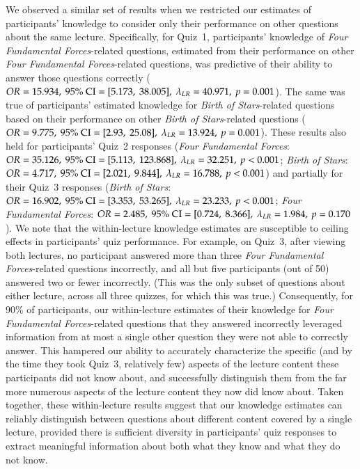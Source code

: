 \documentclass[10pt]{article}
\begin{document}
We observed a similar set of results when we restricted our estimates of
participants' knowledge to consider only
their performance on other questions about the same lecture.
Specifically, for Quiz~1, participants' knowledge of \textit{Four Fundamental
Forces}-related questions, estimated from their performance on other
\textit{Four Fundamental Forces}-related questions, was predictive of their
ability to answer those questions correctly ($OR = 15.934,\ 95\%\
\textnormal{CI} = [5.173,\ 38.005],\ \lambda_{LR} = 40.971,\ p = 0.001$). The
same was true of participants' estimated knowledge for \textit{Birth of
Stars}-related questions based on their performance on other \textit{Birth of
Stars}-related questions ($OR = 9.775,\ 95\%\ \textnormal{CI} = [2.93,\
25.08],\ \lambda_{LR} = 13.924,\ p = 0.001$). These results also held for
participants' Quiz~2 responses (\textit{Four Fundamental Forces}: $OR =
35.126,\ 95\%\ \textnormal{CI} = [5.113,\ 123.868],\ \lambda_{LR} = 32.251,\
p < 0.001$; \textit{Birth of Stars}: $OR = 4.717,\ 95\%\ \textnormal{CI} =
[2.021,\ 9.844],\ \lambda_{LR} = 16.788,\ p < 0.001$) and partially for
their Quiz~3 responses (\textit{Birth of Stars}: $OR = 16.902,\ 95\%\
\textnormal{CI} = [3.353,\ 53.265],\ \lambda_{LR} = 23.233,\ p < 0.001$;
\textit{Four Fundamental Forces}: $OR = 2.485,\ 95\%\ \textnormal{CI} =
[0.724,\ 8.366],\ \lambda_{LR} = 1.984,\ p = 0.170$). We note that 
the within-lecture knowledge estimates are susceptible to ceiling effects in
participants' quiz performance. For example, on Quiz~3, after viewing both lectures, no
participant answered more than three \textit{Four Fundamental Forces}-related
questions incorrectly, and all but five participants (out of 50) answered two or
fewer incorrectly. (This was the only subset of questions about either lecture,
across all three quizzes, for which this was true.) Consequently, for 90\% of
participants, our within-lecture estimates of their knowledge for \textit{Four
Fundamental Forces}-related questions that they answered incorrectly leveraged
information from at most a single other question they were not able to
correctly answer. This hampered our ability to accurately characterize
the specific (and by the time they took Quiz~3, relatively few) aspects of the
lecture content these participants did not know about, and successfully
distinguish them from the far more numerous aspects of the lecture content they
now did know about. Taken together, these within-lecture results suggest that our
knowledge estimates can reliably distinguish between questions about different
content covered by a single lecture, provided there is sufficient diversity in
participants' quiz responses to extract meaningful information about both what
they know and what they do not know.
\end{document}
